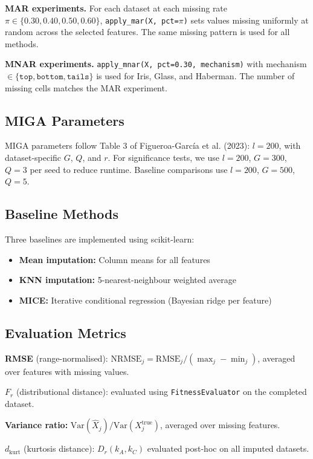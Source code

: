 \textbf{MAR experiments.} For each dataset at each missing rate $\pi \in \{0.30, 0.40, 0.50, 0.60\}$, \texttt{apply\_mar(X, pct=$\pi$)} sets values missing uniformly at random across the selected features. The same missing pattern is used for all methods.

\textbf{MNAR experiments.} \texttt{apply\_mnar(X, pct=0.30, mechanism)} with mechanism $\in \{\texttt{top}, \texttt{bottom}, \texttt{tails}\}$ is used for Iris, Glass, and Haberman. The number of missing cells matches the MAR experiment.

\subsection{MIGA Parameters}

MIGA parameters follow Table 3 of Figueroa-Garc\'ia et al. (2023): $l=200$, with dataset-specific $G$, $Q$, and $r$. For significance tests, we use $l=200$, $G=300$, $Q=3$ per seed to reduce runtime. Baseline comparisons use $l=200$, $G=500$, $Q=5$.

\subsection{Baseline Methods}

Three baselines are implemented using scikit-learn:
\begin{itemize}
    \item \textbf{Mean imputation:} Column means for all features
    \item \textbf{KNN imputation:} 5-nearest-neighbour weighted average
    \item \textbf{MICE:} Iterative conditional regression (Bayesian ridge per feature)
\end{itemize}

\subsection{Evaluation Metrics}

\textbf{RMSE} (range-normalised): $\text{NRMSE}_j = \text{RMSE}_j / (\max_j - \min_j)$, averaged over features with missing values.

\textbf{$F_r$} (distributional distance): evaluated using \texttt{FitnessEvaluator} on the completed dataset.

\textbf{Variance ratio:} $\text{Var}(\hat{X}_j) / \text{Var}(X_j^{\text{true}})$, averaged over missing features.

\textbf{$d_{\text{kurt}}$} (kurtosis distance): $D_r(k_A, k_C)$ evaluated post-hoc on all imputed datasets.

